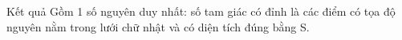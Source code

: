 Kết quả  
Gồm 1 số nguyên duy nhất: số tam giác có đỉnh là các điểm có tọa độ nguyên nằm trong lưới chữ   nhật và có diện tích đúng bằng S.